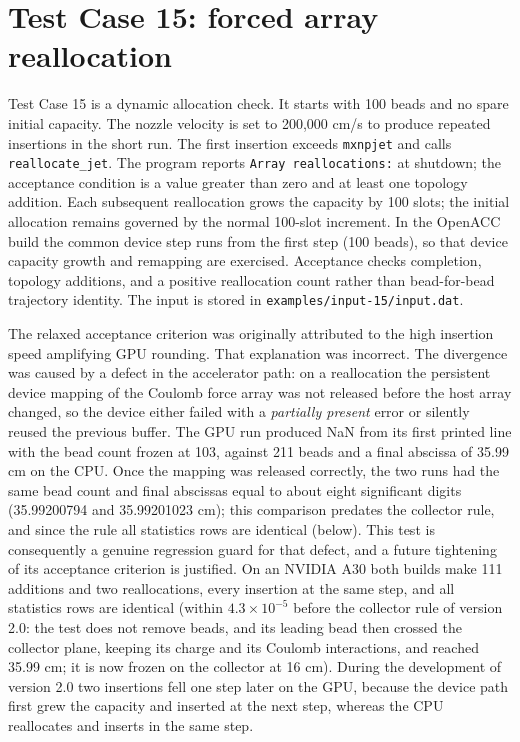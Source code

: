 \section{Test Case 15: forced array reallocation}

Test Case 15 is a dynamic allocation check. It starts with 100 beads and no
spare initial capacity. The nozzle velocity is set to 200,000 cm/s to produce
repeated insertions in the short run. The first insertion exceeds
\texttt{mxnpjet} and calls
\texttt{reallocate\_jet}. The program reports \texttt{Array reallocations:}
at shutdown; the acceptance condition is a value greater than zero and at
least one topology addition. Each subsequent reallocation grows the capacity
by 100 slots; the initial allocation remains governed by the normal
100-slot increment. In the OpenACC build the common device step runs from the
first step (100 beads), so that device capacity growth and remapping are
exercised. Acceptance checks
completion, topology additions, and a positive reallocation count rather than
bead-for-bead trajectory identity. The input is stored in
\texttt{examples/input-15/input.dat}.

The relaxed acceptance criterion was originally attributed to the high
insertion speed amplifying GPU rounding. That explanation was incorrect. The
divergence was caused by a defect in the accelerator path: on a reallocation
the persistent device mapping of the Coulomb force array was not released
before the host array changed, so the device either failed with a
\textit{partially present} error or silently reused the previous buffer. The
GPU run produced NaN from its first printed line with the bead count frozen at
103, against 211 beads and a final abscissa of 35.99 cm on the CPU. Once the
mapping was released correctly, the two runs had the same bead count and
final abscissas equal to about eight significant digits (35.99200794 and
35.99201023 cm); this comparison predates the collector rule, and since the
rule all statistics rows are identical (below). This
test is consequently a genuine regression guard for that defect, and a future
tightening of its acceptance criterion is justified.  On an NVIDIA A30 both
builds make 111 additions and two reallocations, every insertion at the
same step, and all statistics rows are identical (within
$4.3\times10^{-5}$ before the collector rule of version 2.0: the test
does not remove beads, and its leading bead then crossed the collector
plane, keeping its charge and its Coulomb interactions, and reached
35.99 cm; it is now frozen on the collector at 16 cm).  During the
development of version 2.0 two insertions fell one step later on the
GPU, because the device path first grew the capacity and inserted at the
next step, whereas the CPU reallocates and inserts in the same step.
